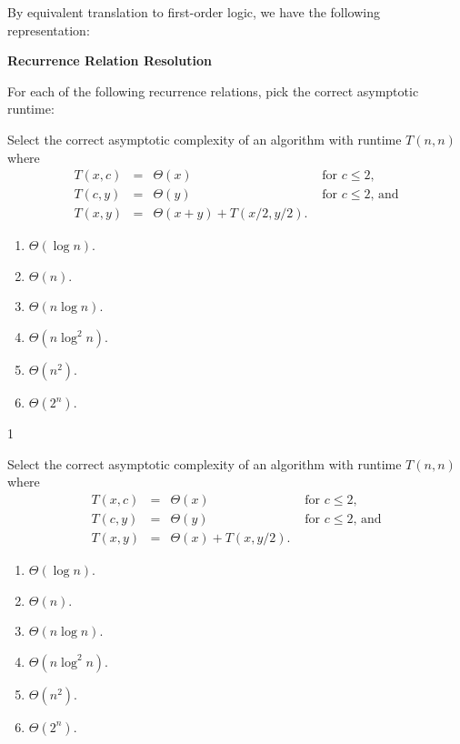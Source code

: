 \documentclass[12pt,twoside]{article}
\begin{document}
\begin{exercises}
\ifsolution \solution{}
By equivalent translation to first-order logic, we have the following
representation:
\fi

\problem {} \textbf{Recurrence Relation Resolution}

For each of the following recurrence relations,
pick the correct asymptotic runtime:

\begin{exerciseparts}

\exercisepart {}
Select the correct asymptotic complexity
of an algorithm with runtime $T(n, n)$
where 
$$
\begin{array}{rcll}
T(x, c) &=& \Theta(x) & \textrm{ for $c \le 2$}, \\
T(c, y) &=& \Theta(y) & \textrm{ for $c \le 2$, and} \\
T(x, y) &=& \Theta(x + y) + T(x / 2, y / 2).
\end{array}
$$

\begin{enumerate}
\item $\Theta(\log n)$.
\item $\Theta(n)$.
\item $\Theta(n \log n)$.
\item $\Theta(n \log^2 n)$.
\item $\Theta(n^2)$.
\item $\Theta(2^n)$.
\end{enumerate}

\ifsolution \solution{}
1
\fi

\exercisepart {}
Select the correct asymptotic complexity
of an algorithm with runtime $T(n, n)$
where 
$$
\begin{array}{rcll}
T(x, c) &=& \Theta(x) & \textrm{ for $c \le 2$}, \\
T(c, y) &=& \Theta(y) & \textrm{ for $c \le 2$, and} \\
T(x, y) &=& \Theta(x) + T(x, y / 2).
\end{array}
$$

\begin{enumerate}
\item $\Theta(\log n)$.
\item $\Theta(n)$.
\item $\Theta(n \log n)$.
\item $\Theta(n \log^2 n)$.
\item $\Theta(n^2)$.
\item $\Theta(2^n)$.
\end{enumerate}


\end{exerciseparts}
\end{exercises}
\end{document}
